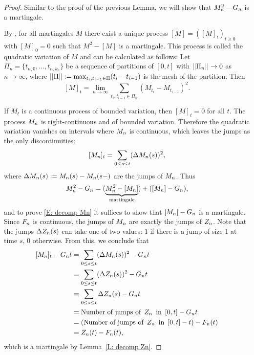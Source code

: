 \begin{proof} \label{P: decomp Mn}
	Similar to the proof of the previous Lemma, we will show that $M_n^2 - G_n$ is a martingale.
	
	By \cite[Theorem 21.70, p.471]{Klenke2013}, 
	for all martingales $M$ there exist a unique process $[M] = ([M]_t)_{t\geq 0}$ with $[M]_0 = 0$ such that
	$M^2 - [M]$	is a martingale.
	This process is called the quadratic variation of $M$ and can be calculated as follows:
	Let $\Pi_n = \{ t_{n,0}, \dots, t_{n,k_n} \}$ be a sequence of partitions of $[0,t]$
	with $||\Pi_n|| \rightarrow 0$ as $n \rightarrow \infty$, 
	where $||\Pi|| := \max_{t_i, t_{i-1} \in \Pi} (t_i - t_{i-1})$ is the mesh of the partition.
	Then
	\begin{equation} \label{E: def quadratic variation}
		[M]_t = \lim_{n \rightarrow \infty} \sum_{t_i, t_{i-1} \in \Pi_n}(M_{t_i} - M_{t_{i-1}})^2.
	\end{equation}
	
	If $M_t$ is a continuous process of bounded variation, then $[M]_t = 0$ for all $t$.
	The process $M_n$ is right-continuous and of bounded variation.
	Therefore the quadratic variation vanishes on intervals where $M_n$ is continuous, 
	which leaves the jumps as the only discontinuities:
	\begin{equation}
	[M_n]_{t} = \sum_{0 \leq s \leq t} (\Delta M_n(s))^2,
	\end{equation}
	where $\Delta M_n(s) := M_n(s) - M_n(s-)$ are the jumps of $M_n$.
	Thus
	\begin{equation}
	M_n^2 - G_n = (\underbrace{M_n^2 - [M_n]}_{\text{martingale}}) + ([M_n] - G_n),
	\end{equation}
	and to prove \eqref{E: decomp Mn} it suffices to show that $[M_n] - G_n$ is a martingale.
	Since $F_n$ is continuous, the jumps of $M_n$ are exactly the jumps of $Z_n$.
	Note that the jumps $\Delta Z_n(s)$ can take one of two values: 
	$1$ if there is a jump of size $1$ at time $s$, 0 otherwise.
	From this, we conclude that
	\begin{align*}
	[M_n]_{t} - G_n{t}
	&= \sum_{0 \leq s \leq t} (\Delta M_n(s))^2 - G_n{t} \\
	&= \sum_{0 \leq s \leq t} (\Delta Z_n(s))^2 - G_n{t} \\
	&= \sum_{0 \leq s \leq t} \Delta Z_n(s) - G_n{t} \\
	&= \text{Number of jumps of} \enspace Z_n \enspace \text{in} \enspace [0,t] - G_n{t} \\
	&= (\text{Number of jumps of} \enspace Z_n \enspace \text{in} \enspace [0,t] - t) - F_n(t) \\
	&= Z_n(t) - F_n(t),
	\end{align*}
	which is a martingale by Lemma~\ref{L: decomp Zn}.
\end{proof}




